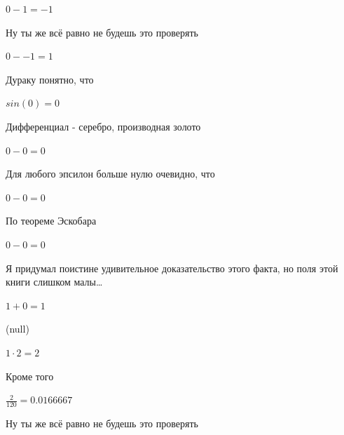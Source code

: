 \documentclass[12pt,a4paper,fleqn]{article}
\begin{document}
\begin{center}
\end{center}
\begin{center}$0-1 = -1$\end{center}
Ну ты же всё равно не будешь это проверять

\begin{center}
\end{center}
\begin{center}$0--1 = 1$\end{center}
Дураку понятно, что

\begin{center}
\end{center}
\begin{center}$sin(0) = 0$\end{center}
Дифференциал - серебро, производная золото\cite{link2}

\begin{center}
\end{center}
\begin{center}$0-0 = 0$\end{center}
Для любого эпсилон больше нулю очевидно, что

\begin{center}
\end{center}
\begin{center}$0-0 = 0$\end{center}
По теореме Эскобара

\begin{center}
\end{center}
\begin{center}$0-0 = 0$\end{center}
Я придумал поистине удивительное доказательство этого факта, но поля этой книги слишком малы\ldots

\begin{center}
\end{center}
\begin{center}$1+0 = 1$\end{center}
(null)\cite{link4}

\begin{center}
\end{center}
\begin{center}$1 \cdot 2 = 2$\end{center}
Кроме того

\begin{center}
\end{center}
\begin{center}$\frac{2}{120} = 0.0166667$\end{center}
Ну ты же всё равно не будешь это проверять
\end{document}
